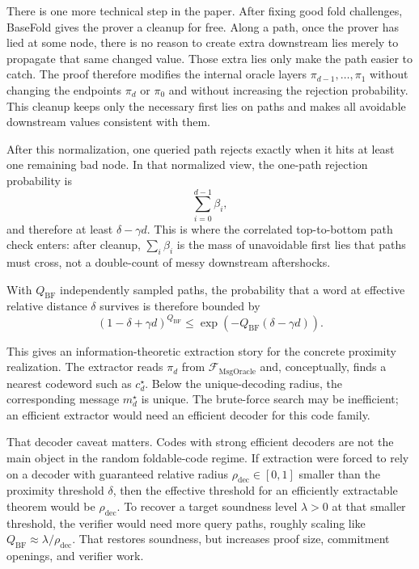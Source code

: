 There is one more technical step in the paper.  After fixing good fold
challenges, BaseFold gives the prover a cleanup for free.  Along a path, once
the prover has lied at some node, there is no reason to create extra downstream
lies merely to propagate that same changed value.  Those extra lies only make the
path easier to catch.  The proof therefore modifies the internal oracle layers
$\pi_{d-1},\ldots,\pi_1$ without changing the endpoints $\pi_d$ or $\pi_0$ and
without increasing the rejection probability.  This cleanup keeps only the
necessary first lies on paths and makes all avoidable downstream values
consistent with them.

After this normalization, one queried path rejects exactly when it hits at least
one remaining bad node.  In that normalized view, the one-path rejection
probability is
\[
  \sum_{i=0}^{d-1}\beta_i,
\]
and therefore at least $\delta-\gamma d$.  This is where the correlated
top-to-bottom path check enters: after cleanup, $\sum_i\beta_i$ is the mass of
unavoidable first lies that paths must cross, not a double-count of messy
downstream aftershocks.

With $Q_{\mathrm{BF}}$ independently sampled paths, the probability that a word
at effective relative distance $\delta$ survives is therefore bounded by
\[
  (1-\delta+\gamma d)^{Q_{\mathrm{BF}}}
  \le
  \exp\!\left(-Q_{\mathrm{BF}}(\delta-\gamma d)\right).
\]

This gives an information-theoretic extraction story for the concrete
proximity realization.  The extractor reads $\pi_d$ from
$\mathcal F_{\mathrm{MsgOracle}}$ and, conceptually, finds a nearest codeword such
as $c_d^\star$.  Below the unique-decoding radius, the corresponding message
$m_d^\star$ is unique.  The brute-force search may be inefficient; an efficient
extractor would need an efficient decoder for this code family.

That decoder caveat matters.  Codes with strong efficient decoders are not the
main object in the random foldable-code regime.  If extraction were forced to
rely on a decoder with guaranteed relative radius
$\rho_{\mathrm{dec}}\in[0,1]$ smaller than the proximity threshold
\(\delta\), then the effective threshold for an efficiently extractable theorem would be
$\rho_{\mathrm{dec}}$.  To recover a target soundness level $\lambda>0$ at that
smaller threshold, the verifier would need more query paths, roughly scaling
like $Q_{\mathrm{BF}}\approx\lambda/\rho_{\mathrm{dec}}$.  That restores
soundness, but increases proof size, commitment openings, and verifier work.

